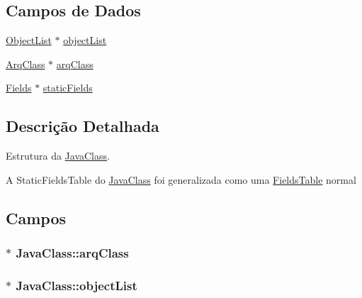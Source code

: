 \subsection*{Campos de Dados}
\begin{DoxyCompactItemize}
\item 
\hyperlink{struct_object_list}{Object\+List} $\ast$ \hyperlink{struct_java_class_af33546b53017ca696367a08e9e30b115}{object\+List}
\item 
\hyperlink{_e___j_v_m_8h_a58bbd58859ab48cb1bd6c2ffb5874839}{Arq\+Class} $\ast$ \hyperlink{struct_java_class_a9957134e0b17228e4769414cd3e0debc}{arq\+Class}
\item 
\hyperlink{struct_fields}{Fields} $\ast$ \hyperlink{struct_java_class_a4ce091e3ddb1f607166c6e64c39cf53a}{static\+Fields}
\end{DoxyCompactItemize}


\subsection{Descrição Detalhada}
Estrutura da \hyperlink{struct_java_class}{Java\+Class}. 

A Static\+Fields\+Table do \hyperlink{struct_java_class}{Java\+Class} foi generalizada como uma \hyperlink{struct_fields_table}{Fields\+Table} normal 

\subsection{Campos}
\hypertarget{struct_java_class_a9957134e0b17228e4769414cd3e0debc}{}
\subsubsection[{arq\+Class}]{$\ast$ Java\+Class\+::arq\+Class}\label{struct_java_class_a9957134e0b17228e4769414cd3e0debc}
\hypertarget{struct_java_class_af33546b53017ca696367a08e9e30b115}{}
\subsubsection[{object\+List}]{$\ast$ Java\+Class\+::object\+List}\label{struct_java_class_af33546b53017ca696367a08e9e30b115}
\hypertarget{struct_java_class_a4ce091e3ddb1f607166c6e64c39cf53a}{}
